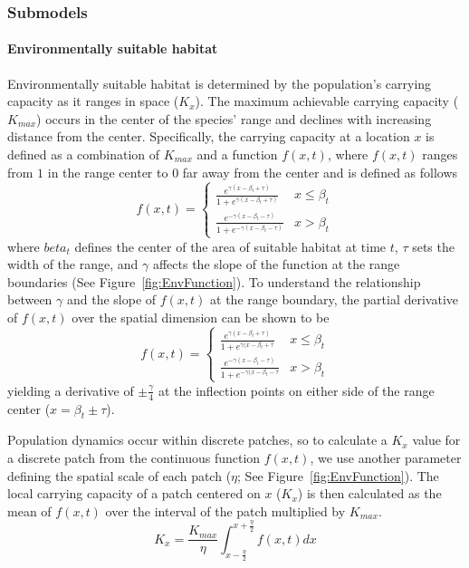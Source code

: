 \documentclass[11pt, oneside]{article}
\begin{document}
\subsubsection{Submodels}
\paragraph{Environmentally suitable habitat}
Environmentally suitable habitat is determined by the population's carrying capacity as it ranges in space ($K_{x}$). The maximum achievable carrying capacity ($K_{max}$) occurs in the center of the species' range and declines with increasing distance from the center. Specifically, the carrying capacity at a location $x$ is defined as a combination of $K_{max}$ and a function $f(x,t)$, where $f(x,t)$ ranges from $1$ in the range center to $0$ far away from the center and is defined as follows 
\begin{equation}
f(x,t)=
\begin{cases}
	\frac{e^{\gamma(x-\beta_{t}+\tau)}}{1+e^{\gamma(x-\beta_{t}+\tau)}} & x \leq \beta_{t} \\
	\frac{e^{-\gamma(x-\beta_{t}-\tau)}}{1+e^{-\gamma(x-\beta_{t}-\tau)}} & x > \beta_{t}
\end{cases}
\end{equation}
where $beta_{t}$ defines the center of the area of suitable habitat at time $t$, $\tau$ sets the width of the range, and $\gamma$ affects the slope of the function at the range boundaries (See Figure~\ref{fig:EnvFunction}). To understand the relationship between $\gamma$ and the slope of $f(x,t)$ at the range boundary, the partial derivative of $f(x,t)$ over the spatial dimension can be shown to be
\begin{equation}
f(x,t)=
\begin{cases}
	\frac{e^{\gamma(x-\beta_{t}+\tau)}}{1+e^{\gamma(x-\beta_{t}+\tau}} & x \leq \beta_{t} \\
	\frac{e^{-\gamma(x-\beta_{t}-\tau)}}{1+e^{-\gamma(x-\beta_{t}-\tau}} & x > \beta_{t}
\end{cases}	
\end{equation}
yielding a derivative of $\pm\frac{\gamma}{4}$ at the inflection points on either side of the range center ($x=\beta_{t}\pm\tau$).

Population dynamics occur within discrete patches, so to calculate a $K_{x}$ value for a discrete patch from the continuous function $f(x,t)$, we use another parameter defining the spatial scale of each patch ($\eta$; See Figure~\ref{fig:EnvFunction}). The local carrying capacity of a patch centered on $x$ ($K_{x}$) is then calculated as the mean of $f(x,t)$ over the interval of the patch multiplied by $K_{max}$.
\begin{equation}
K_{x} = \frac{K_{max}}{\eta}\int_{x-\frac{\eta}{2}}^{x+\frac{\eta}{2}}f(x,t)dx
\end{equation}
\end{document}
